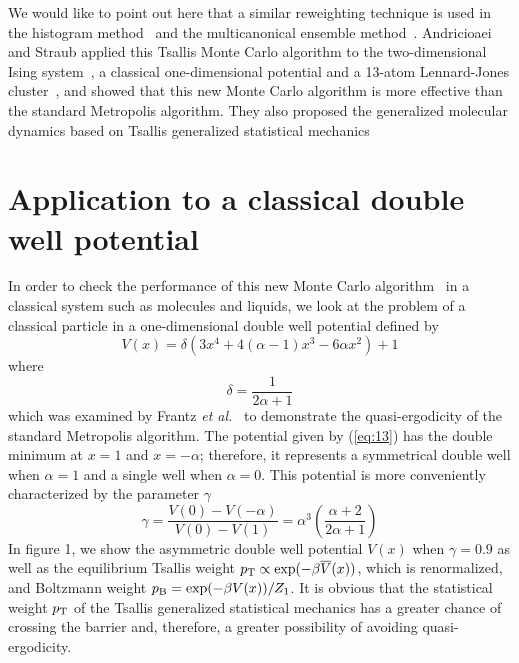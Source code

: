 We would like to point out here that a similar reweighting 
technique is used in the histogram method~\cite{FS} and 
the multicanonical ensemble method~\cite{BN}. Andricioaei and 
Straub applied this Tsallis Monte Carlo algorithm to the 
two-dimensional Ising system~\cite{AS2}, a classical one-dimensional 
potential and a 13-atom Lennard-Jones cluster~\cite{AS3}, and 
showed that this new Monte Carlo algorithm is more effective 
than the standard Metropolis algorithm.  They also proposed the
generalized molecular dynamics based on Tsallis generalized statistical
mechanics~\cite{AS3,SA}


\section{Application to a classical double well potential} 

In order to check the performance of this new Monte Carlo 
algorithm~\cite{AS2,AS3} in a classical system such as molecules 
and liquids, we look at the problem of a classical particle 
in a one-dimensional double well potential defined by
\begin{equation}
V(x)=\delta\left(3 x^{4}+4(\alpha-1)x^{3}-6\alpha x^{2}\right)+1 
\label{eq:13}
\end{equation}
where
\begin{equation}
\delta=\frac{1}{2\alpha+1}
\label{eq:14}
\end{equation}
which was examined by Frantz {\it et al.}~\cite{FFD} to demonstrate 
the quasi-ergodicity of the standard Metropolis algorithm. The 
potential given by (\ref{eq:13}) has the double minimum at $x=1$ 
and $x=-\alpha$; therefore, it represents a symmetrical double well 
when $\alpha=1$ and a single well when $\alpha=0$. This potential 
is more conveniently characterized by the parameter $\gamma$~\cite{FFD} 
\begin{equation}
\gamma=\frac{V(0)-V(-\alpha)}{V(0)-V(1)}
=\alpha^{3}\left(\frac{\alpha+2}{2\alpha+1}\right)
\label{eq:15}
\end{equation}
In figure 1, we show the asymmetric double well potential $V(x)$ 
when $\gamma=0.9$ as well as the equilibrium Tsallis weight 
$p_{\rm T}\propto \exp(-\beta \overline{V}(x))$, which is renormalized, 
and Boltzmann weight $p_{\rm B}=\exp(-\beta V(x))/Z_{1}$. It is obvious 
that the statistical weight $p_{\rm T}$ of the Tsallis generalized 
statistical mechanics has a greater chance of crossing the barrier 
and, therefore, a greater possibility of avoiding quasi-ergodicity.


